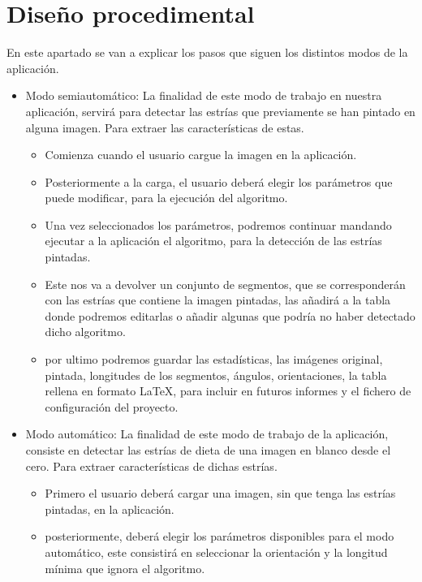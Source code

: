 \section{Diseño procedimental}
En este apartado se van a explicar los pasos que siguen los distintos modos de la aplicación.

\begin{itemize}
	\item Modo semiautomático:
La finalidad de este modo de trabajo en nuestra aplicación, servirá para detectar las estrías que previamente se han pintado en alguna imagen. Para extraer las características de estas.
	\begin{itemize}
		\item Comienza cuando el usuario cargue la imagen en la aplicación.
		\item Posteriormente a la carga, el usuario deberá elegir los parámetros que puede modificar, para la ejecución del algoritmo.
		\item Una vez seleccionados los parámetros, podremos continuar mandando ejecutar a la aplicación el algoritmo, para la detección de las estrías pintadas.
		\item Este nos va a devolver un conjunto de segmentos, que se corresponderán con las estrías que contiene la imagen pintadas, las añadirá a la tabla donde podremos editarlas o añadir algunas que podría no haber detectado dicho algoritmo.
		\item por ultimo podremos guardar las estadísticas, las imágenes original, pintada, longitudes de los segmentos, ángulos, orientaciones, la tabla rellena en formato \LaTeX , para incluir en futuros informes y el fichero de configuración del proyecto.
	\end{itemize}
	\item Modo automático:
	La finalidad de este modo de trabajo de la aplicación, consiste en detectar las estrías de dieta de una imagen en blanco desde el cero. Para extraer características de dichas estrías.
	\begin{itemize}
		\item Primero el usuario deberá cargar una imagen, sin que tenga las estrías pintadas, en la aplicación.
		\item posteriormente, deberá elegir los parámetros disponibles para el modo automático, este consistirá en seleccionar la orientación y la longitud mínima que ignora el algoritmo.
		

\end{itemize}
\end{itemize}
